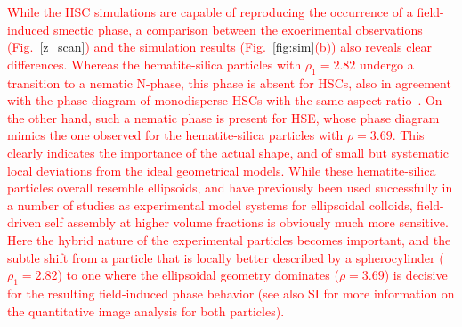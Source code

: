 \documentclass[aps,prl,preprint,superscriptaddress]{revtex4-1} %
\begin{document}
\textcolor{red}{While the HSC simulations are capable of reproducing the occurrence of a field-induced smectic phase, a comparison between the exoerimental observations (Fig.~\ref{z_scan}) and the simulation results (Fig.~\ref{fig:sim}(b)) also reveals clear differences. Whereas the hematite-silica particles with $\rho_1=2.82$ undergo a transition to a nematic N-phase, this phase is absent for HSCs, also in agreement with the phase diagram of monodisperse HSCs
with the same aspect ratio~\cite{Bolhuis1997}. On the other hand, such a nematic phase is present for HSE, whose phase diagram mimics the one observed for the hematite-silica particles with $\rho=3.69$. This clearly indicates the importance of the actual shape, and of small but systematic local deviations from the ideal geometrical models. While these hematite-silica particles overall resemble ellipsoids, and have previously been used successfully in a number of studies as experimental model systems for ellipsoidal colloids, field-driven self assembly at higher volume fractions is obviously much more sensitive. Here the hybrid nature of the experimental particles becomes important, and the subtle shift from a particle that is locally better described by a spherocylinder ($\rho_1=2.82$) to one where the ellipsoidal geometry dominates ($ \rho=3.69$) is decisive for the resulting field-induced phase behavior (see also SI for more information on the quantitative image analysis for both particles).}
\end{document}

